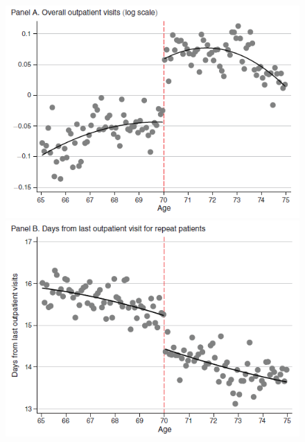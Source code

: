 \documentclass[../root]{subfiles}
\begin{document}
    \begin{figure}[ht]
      \centering
      \includegraphics[scale = .8]{0710tanji/F2a}
      \includegraphics[scale = .8]{0710tanji/F2b}
    \end{figure}
\end{document}
